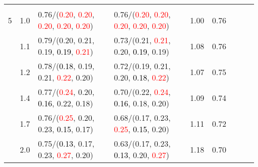 \documentclass[10pt,a4paper]{report}
\begin{document}
\begin{table}[!htbp]
\begin{center}
{\begin{tabular}{ccllccccc}
				  &                                   &                                                                                                                                                 &                                                                                                                                                 &                                             \\
				5 & 1.0                               & 0.76/(\textcolor{red}{0.20}, \textcolor{red}{0.20}, \textcolor{red}{0.20}, \textcolor{red}{0.20}, \textcolor{red}{0.20})                        & 0.76/(\textcolor{red}{0.20}, \textcolor{red}{0.20}, \textcolor{red}{0.20}, \textcolor{red}{0.20}, \textcolor{red}{0.20})                        & 1.00             & 0.76                     \\
				  & 1.1                               & 0.79/(0.20, 0.21, 0.19, \textcolor{black}{0.19}, \textcolor{red}{0.21})                                                                         & 0.73/(0.21, \textcolor{red}{0.21}, 0.20, \textcolor{black}{0.19}, 0.19)                                                                         & 1.08             & 0.76                     \\
				  & 1.2                               & 0.78/(\textcolor{black}{0.18}, 0.19, 0.21, \textcolor{red}{0.22}, 0.20)                                                                         & 0.72/(0.19, 0.21, 0.20, \textcolor{black}{0.18}, \textcolor{red}{0.22})                                                                         & 1.07             & 0.75                     \\
				  & 1.4                               & 0.77/(\textcolor{red}{0.24}, 0.20, \textcolor{black}{0.16}, 0.22, 0.18)                                                                         & 0.70/(0.22, \textcolor{red}{0.24}, \textcolor{black}{0.16}, 0.18, 0.20)                                                                         & 1.09             & 0.74                     \\
				  & 1.7                               & 0.76/(\textcolor{red}{0.25}, 0.20, 0.23, \textcolor{black}{0.15}, 0.17)                                                                         & 0.68/(0.17, 0.23, \textcolor{red}{0.25}, \textcolor{black}{0.15}, 0.20)                                                                         & 1.11             & 0.72                     \\
				  & 2.0                               & 0.75/(\textcolor{black}{0.13}, 0.17, 0.23, \textcolor{red}{0.27}, 0.20)                                                                         & 0.63/(0.17, 0.23, \textcolor{black}{0.13}, 0.20, \textcolor{red}{0.27})                                                                         & 1.18             & 0.70                     \\

\end{tabular}}
\end{center}
\end{table}
\end{document}
